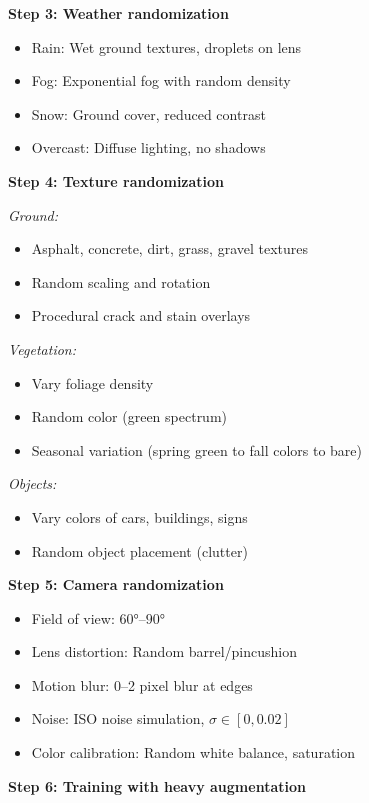 \begin{example}
\textbf{Step 3: Weather randomization}

\begin{itemize}
    \item Rain: Wet ground textures, droplets on lens
    \item Fog: Exponential fog with random density
    \item Snow: Ground cover, reduced contrast
    \item Overcast: Diffuse lighting, no shadows
\end{itemize}

\textbf{Step 4: Texture randomization}

\textit{Ground:}
\begin{itemize}
    \item Asphalt, concrete, dirt, grass, gravel textures
    \item Random scaling and rotation
    \item Procedural crack and stain overlays
\end{itemize}

\textit{Vegetation:}
\begin{itemize}
    \item Vary foliage density
    \item Random color (green spectrum)
    \item Seasonal variation (spring green to fall colors to bare)
\end{itemize}

\textit{Objects:}
\begin{itemize}
    \item Vary colors of cars, buildings, signs
    \item Random object placement (clutter)
\end{itemize}

\textbf{Step 5: Camera randomization}

\begin{itemize}
    \item Field of view: $60°$--$90°$
    \item Lens distortion: Random barrel/pincushion
    \item Motion blur: 0--2 pixel blur at edges
    \item Noise: ISO noise simulation, $\sigma \in [0, 0.02]$
    \item Color calibration: Random white balance, saturation
\end{itemize}

\textbf{Step 6: Training with heavy augmentation}


\end{example}

